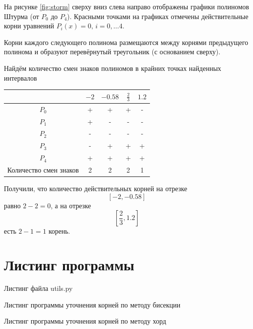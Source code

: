 На рисунке \ref{fig:storm} сверху вниз слева направо отображены графики полиномов Штурма (от $P_0$ до $P_4$).
Красными точками на графиках отмечены действительные корни уравнений $P_i \left( x \right) = 0, \, i = 0, \dotsc 4$.

Корни каждого следующего полинома размещаются между корнями предыдущего полинома и образуют перевёрнутый треугольник (с основанием сверху).

Найдём количество смен знаков полиномов в крайних точках найденных интервалов

\begin{center}
  \begin{tabular}{ | c | c | c | c | c |}
    \hline
    & $-2$ & $-0.58$ & $ \frac{2}{3}$ & $1.2$ \\ \hline
    $P_0$ & + & + & + & - \\ \hline
    $P_1$ & + & - & - & - \\ \hline
    $P_2$ & - & - & - & - \\ \hline
    $P_3$ & - & + & + & + \\ \hline
    $P_4$ & + & + & + & + \\ \hline
    Количество смен знаков & 2 & 2 & 2 & 1 \\
    \hline
  \end{tabular}
\end{center}

Получили, что количество действительных корней на отрезке
$$ \left[ -2, -0.58 \right] $$
равно $2 - 2 = 0$, а на отрезке
$$ \left[ \frac{2}{3}, 1.2 \right] $$
есть $2 - 1 = 1$ корень.

\chapter{Листинг программы}

Листинг файла utils.py
\lstset{inputencoding=utf8, extendedchars=\true}


Листинг программы уточнения корней по методу бисекции
\lstset{inputencoding=utf8, extendedchars=\true}


Листинг программы уточнения корней по методу хорд
\lstset{inputencoding=utf8, extendedchars=\true}


